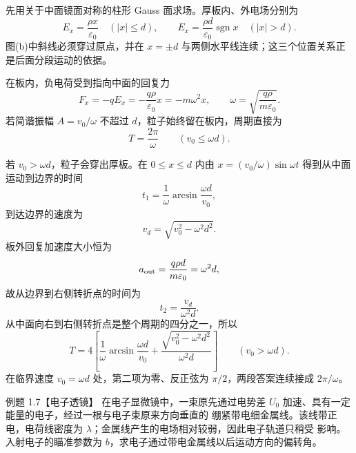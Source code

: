 \begin{xesolution}
先用关于中面镜面对称的柱形 Gauss 面求场。厚板内、外电场分别为
\[
  \boxed{E_x=\frac{\rho x}{\varepsilon_0}\quad(|x|\le d)},
  \qquad
  \boxed{E_x=\frac{\rho d}{\varepsilon_0}\operatorname{sgn}x\quad(|x|>d)}.
\]
图(b)中斜线必须穿过原点，并在 $x=\pm d$ 与两侧水平线连续；这三个位置关系正是后面分段运动的依据。

\chargedSlabFigure

在板内，负电荷受到指向中面的回复力
\[
  F_x=-qE_x=-\frac{q\rho}{\varepsilon_0}x=-m\omega^2x,
  \qquad
  \boxed{\omega=\sqrt{\frac{q\rho}{m\varepsilon_0}}}.
\]
若简谐振幅 $A=v_0/\omega$ 不超过 $d$，粒子始终留在板内，周期直接为
\[
  \boxed{T=\frac{2\pi}{\omega}}
  \qquad (v_0\le\omega d).
\]

若 $v_0>\omega d$，粒子会穿出厚板。在 $0\le x\le d$ 内由
$x=(v_0/\omega)\sin\omega t$ 得到从中面运动到边界的时间
\[
  t_1=\frac1\omega\arcsin\frac{\omega d}{v_0},
\]
到达边界的速度为
\[
  v_d=\sqrt{v_0^2-\omega^2d^2}.
\]
板外回复加速度大小恒为
\[
  a_{\rm out}=\frac{q\rho d}{m\varepsilon_0}=\omega^2d,
\]
故从边界到右侧转折点的时间为
\[
  t_2=\frac{v_d}{\omega^2d}.
\]
从中面向右到右侧转折点是整个周期的四分之一，所以
\[
  \boxed{T=4\left[
  \frac1\omega\arcsin\frac{\omega d}{v_0}
  +\frac{\sqrt{v_0^2-\omega^2d^2}}{\omega^2d}
  \right]}
  \qquad(v_0>\omega d).
\]
在临界速度 $v_0=\omega d$ 处，第二项为零、反正弦为 $\pi/2$，两段答案连续接成
$2\pi/\omega$。
\end{xesolution}

\begin{origexamplebox}{例题 1.7【电子透镜】}
在电子显微镜中，一束原先通过电势差 $U_0$ 加速、具有一定能量的电子，经过一根与电子束原来方向垂直的
绷紧带电细金属线。该线带正电，电荷线密度为 $\lambda$；金属线产生的电场相对较弱，因此电子轨道只稍受
影响。入射电子的瞄准参数为 $b$，求电子通过带电金属线以后运动方向的偏转角。
\end{origexamplebox}

